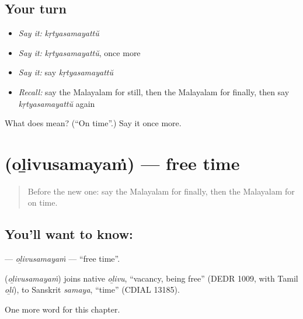 \subsection*{Your turn}
\begin{itemize}
\raggedright
  \item \emph{Say it:} \emph{kṛtyasamayattŭ}
  \item \emph{Say it:} \emph{kṛtyasamayattŭ}, once more
  \item \emph{Say it:} say \emph{kṛtyasamayattŭ}
  \item \emph{Recall:} say the Malayalam for still, then the Malayalam for finally, then say \emph{kṛtyasamayattŭ} again
\end{itemize}

\begin{tcolorbox}[breakable,colback=teal!4,colframe=teal!35!black,title={Before you move on}]
What does  mean? (\textquotedblleft{}On time\textquotedblright{}.) Say it once more.
\end{tcolorbox}
\section[\texorpdfstring{\ml{ഒഴിവുസമയം} (oḻivusamayaṁ)}{ഒഴിവുസമയം (oḻivusamayaṁ)}]{ (oḻivusamayaṁ) — free time}

\label{lesson:ML-C196-olivusamayam}



\begin{quote}
Before the new one: say the Malayalam for finally, then the Malayalam for on time.
\end{quote}

\subsection*{You'll want to know: }
\textbf{} — \emph{oḻivusamayaṁ} — \textquotedblleft{}free time\textquotedblright{}.

\begin{cousinweb}
\textbf{} (\emph{oḻivusamayaṁ}) joins native \emph{oḻivu}, \textquotedblleft{}vacancy, being free\textquotedblright{} (DEDR 1009, with Tamil \emph{oḻi}), to Sanskrit \emph{samaya}, \textquotedblleft{}time\textquotedblright{} (CDIAL 13185).
\end{cousinweb}

\begin{grammarlens}[title={What you've built}]
One more word for this chapter.
\end{grammarlens}

